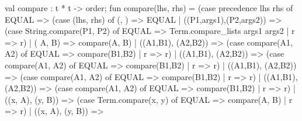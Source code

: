 \nwenddocs{}\plusendmoddef\nwstartdeflinemarkup{}\nwenddeflinemarkup
val compare : t * t -> order;
\nwendcode{}\nwdocspar
\nwenddocs{}\endmoddef\nwstartdeflinemarkup{}\nwenddeflinemarkup
fun compare(lhs, rhs) =
 (case precedence lhs rhs of
   EQUAL => (case (lhs, rhs) of
              (, ) => EQUAL
            | ((P1,args1),(P2,args2)) =>
              (case String.compare(P1, P2) of
                EQUAL => Term.compare_lists args1 args2
              | r => r)
            | ( A,  B) => compare(A, B)
            | ((A1,B1), (A2,B2)) => 
                (case compare(A1, A2) of
                  EQUAL => compare(B1,B2)
                | r => r)
            | ((A1,B1), (A2,B2)) => 
                (case compare(A1, A2) of
                  EQUAL => compare(B1,B2)
                | r => r)
            | ((A1,B1), (A2,B2)) => 
                (case compare(A1, A2) of
                  EQUAL => compare(B1,B2)
                | r => r)
            | ((A1,B1), (A2,B2)) => 
                (case compare(A1, A2) of
                  EQUAL => compare(B1,B2)
                | r => r)
            | ((x, A), (y, B)) =>
                (case Term.compare(x, y) of
                  EQUAL => compare(A, B)
                | r => r)
            | ((x, A), (y, B)) =>
